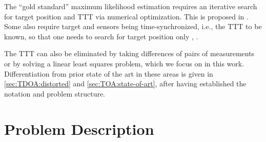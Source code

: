 \documentclass[conference]{IEEEtran}
\begin{document}
%
%
The ``gold standard'' maximum likelihood estimation requires an iterative search for target position and \ac{TTT} via numerical optimization. This is proposed in 
\cite{PerezCruz2019_ProbabilisticTimeOfArrivalLocalization}. 
%
%
Some also require target and sensors being time-synchronized, i.e., the \ac{TTT} to be known, so that one needs to search for target position only 
\cite{Xiong2024_RobustTimeOfArrivalLocalizationViaADMM}, 
\cite{Le2016_ClosedFormAndNearClosedFormSolutionsForTOABasedJointSourceAndSensorLocalization}. 

%
%
The \ac{TTT} can also be eliminated by taking differences of pairs of measurements or by solving a linear least squares problem, which we focus on in this work. Differentiation from prior state of the art in these areas is given in \cref{sec:TDOA:distorted} and \cref{sec:TOA:state-of-art}, after having established the notation and problem structure. 


%
%
\section{Problem Description}
%
%
\end{document}
